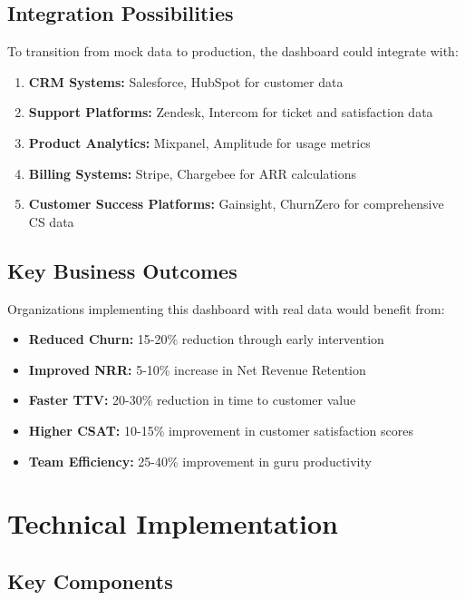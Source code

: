 \documentclass[12pt,a4paper]{article}
\begin{document}
\subsection{Integration Possibilities}

To transition from mock data to production, the dashboard could integrate with:

\begin{enumerate}
    \item \textbf{CRM Systems:} Salesforce, HubSpot for customer data
    \item \textbf{Support Platforms:} Zendesk, Intercom for ticket and satisfaction data
    \item \textbf{Product Analytics:} Mixpanel, Amplitude for usage metrics
    \item \textbf{Billing Systems:} Stripe, Chargebee for ARR calculations
    \item \textbf{Customer Success Platforms:} Gainsight, ChurnZero for comprehensive CS data
\end{enumerate}

\subsection{Key Business Outcomes}

Organizations implementing this dashboard with real data would benefit from:

\begin{itemize}
    \item \textbf{Reduced Churn:} 15-20\% reduction through early intervention
    \item \textbf{Improved NRR:} 5-10\% increase in Net Revenue Retention
    \item \textbf{Faster TTV:} 20-30\% reduction in time to customer value
    \item \textbf{Higher CSAT:} 10-15\% improvement in customer satisfaction scores
    \item \textbf{Team Efficiency:} 25-40\% improvement in guru productivity
\end{itemize}

\section{Technical Implementation}

\subsection{Key Components}
\end{document}
